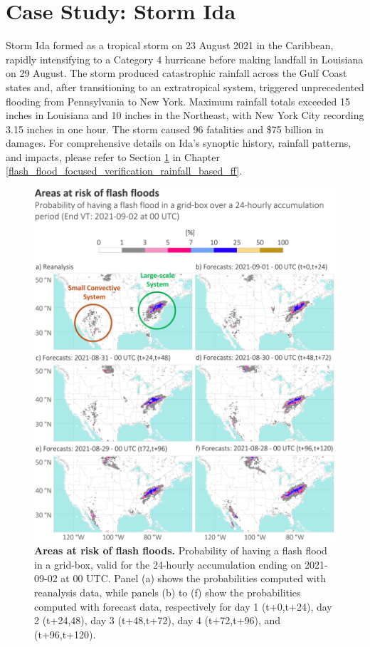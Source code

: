 \section{Case Study: Storm Ida}
\label{flash_flood_focused_verification_rainfall_based_ff_CASE_STUDY}

Storm Ida formed as a tropical storm on 23 August 2021 in the Caribbean, rapidly intensifying to a Category 4 hurricane before making landfall in Louisiana on 29 August. The storm produced catastrophic rainfall across the Gulf Coast states and, after transitioning to an extratropical system, triggered unprecedented flooding from Pennsylvania to New York. Maximum rainfall totals exceeded 15 inches in Louisiana and 10 inches in the Northeast, with New York City recording 3.15 inches in one hour. The storm caused 96 fatalities and \$75 billion in damages. For comprehensive details on Ida's synoptic history, rainfall patterns, and impacts, please refer to Section \ref{flash_flood_focused_verification_rainfall_based_ff_CASE_STUDY} in Chapter \ref{flash_flood_focused_verification_rainfall_based_ff}.

\begin{figure}[htbp]
\centering
\includegraphics[width=\textwidth]{case_study_poff.png}
\caption{\textbf{Areas at risk of flash floods.} Probability of having a flash flood in a grid-box, valid for the 24-hourly accumulation ending on 2021-09-02 at 00 UTC. Panel (a) shows the probabilities computed with reanalysis data, while panels (b) to (f) show the probabilities computed with forecast data, respectively for day 1 (t+0,t+24), day 2 (t+24,48), day 3 (t+48,t+72), day 4 (t+72,t+96), and (t+96,t+120).}
\label{fig:case_study_poff}
\end{figure}

